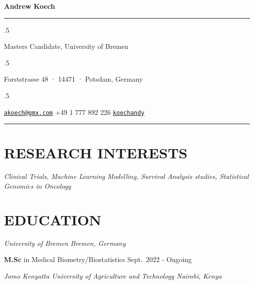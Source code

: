 \documentclass[12.5pt,]{article}
\providecommand{\tightlist}{%
  \setlength{\itemsep}{0pt}\setlength{\parskip}{0pt}}
\renewenvironment{itemize}{
  \begin{list}{}{
    \setlength{\leftmargin}{1.5em}
  }
}{
  \end{list}
}
\begin{document}
\centerline{\huge \bf Andrew Koech}

\vspace{2 mm}

\hrule

\vspace{2 mm}

\moveleft.5\hoffset\centerline{Masters Candidate, University of Bremen}
\moveleft.5\hoffset\centerline{Forststrasse 48 · 14471 · Potsdam,
Germany}
\moveleft.5\hoffset\centerline{ \faEnvelopeO \hspace{1 mm} \href{mailto:}{\tt \href{mailto:akoech@gmx.com}{\nolinkurl{akoech@gmx.com}}} \hspace{1 mm}  \faPhone \hspace{1 mm}  +49
1 777 892
226  \hspace{1 mm}  \faGithub \hspace{1 mm} \href{http://github.com/koechandy}{\tt koechandy} \hspace{1 mm}      } 

\vspace{2 mm}

\hrule


\hypertarget{research-interests}{%
\section{\texorpdfstring{\textbf{RESEARCH
INTERESTS}}{RESEARCH INTERESTS}}\label{research-interests}}

\begin{itemize}
\tightlist
\item
  \emph{Clinical Trials, Machine Learning Modelling, Survival Analysis
  studies, Statistical Genomics in Oncology}
\end{itemize}

\hypertarget{education}{%
\section{\texorpdfstring{\textbf{EDUCATION}}{EDUCATION}}\label{education}}

\emph{University of Bremen} \hfill \emph{Bremen, Germany}

\begin{itemize}
\tightlist
\item
  \textbf{M.Sc} in Medical Biometry/Biostatistics \hfill Sept.~2022 -
  Ongoing
\end{itemize}

\emph{Jomo Kenyatta University of Agriculture and Technology}
\hfill \emph{Nairobi, Kenya}
\end{document}
